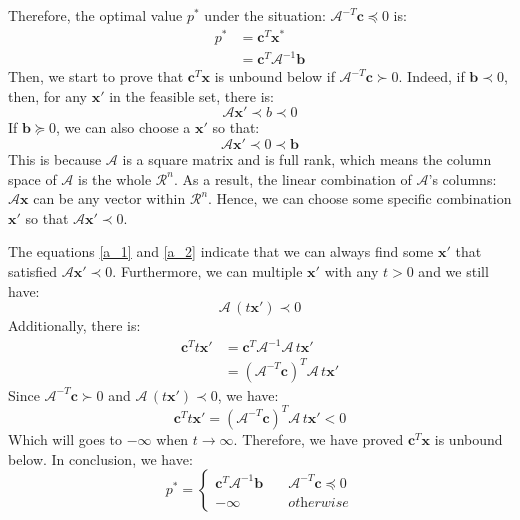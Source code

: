 \documentclass[10pt,a4paper]{article}
\begin{document}
Therefore, the optimal value $p^{*}$ under the situation: $\mathcal{A}^{-T} \mathbf{c} \preceq 0$ is:
\begin{equation}
	\begin{aligned}
		p^{*} &= \mathbf{c}^{T} \mathbf{x}^{*} \\
		&= \mathbf{c}^{T} \mathcal{A}^{-1} \mathbf{b}
	\end{aligned}
\end{equation}
Then, we start to prove that $\mathbf{c}^{T} \mathbf{x}$ is unbound below if $\mathcal{A}^{-T} \mathbf{c} \succ 0$. Indeed, if $\mathbf{b} \prec 0$, then, for any $\mathbf{x}'$ in the feasible set, there is:
\begin{equation}
	\mathcal{A} \mathbf{x}' \prec b \prec 0
	\label{a_1}
\end{equation}
If $\mathbf{b} \succeq 0$, we can also choose a $\mathbf{x}'$ so that:
\begin{equation}
	\mathcal{A} \mathbf{x}' \prec 0 \prec \mathbf{b}
	\label{a_2}
\end{equation}
This is because $\mathcal{A}$ is a square matrix and is full rank, which means the column space of $\mathcal{A}$ is the whole $\mathcal{R}^{n}$. As a result, the linear combination of $\mathcal{A}$'s columns: $\mathcal{A} \mathbf{x}$ can be any vector within $\mathcal{R}^{n}$. Hence, we can choose some specific combination $\mathbf{x}'$ so that $\mathcal{A} \mathbf{x}' \prec 0$.

The equations \ref{a_1} and \ref{a_2} indicate that we can always find some $\mathbf{x}'$ that satisfied  $\mathcal{A} \mathbf{x}' \prec 0$. Furthermore, we can multiple $\mathbf{x}'$ with any $t > 0$ and we still have:
\begin{equation}
	\mathcal{A} \, (t \mathbf{x}') \prec 0
\end{equation}
 Additionally, there is:
 \begin{equation}
 	\begin{aligned}
 		\mathbf{c}^{T} t\mathbf{x}' &=\mathbf{c}^{T} \mathcal{A}^{-1} \mathcal{A} \, t\mathbf{x}' \\
 		&= (\mathcal{A}^{-T} \mathbf{c})^{T} \mathcal{A} \, t \mathbf{x}'
 	\end{aligned}
 \end{equation}
Since $\mathcal{A}^{-T} \mathbf{c} \succ 0$ and $\mathcal{A} \, (t \mathbf{x}') \prec 0$, we have:
\begin{equation}
	\mathbf{c}^{T} t\mathbf{x}' = (\mathcal{A}^{-T} \mathbf{c})^{T} \mathcal{A} \, t \mathbf{x}' < 0
\end{equation}
Which will goes to $-\infty$ when $t \rightarrow \infty$. Therefore, we have proved $\mathbf{c}^{T} \mathbf{x}$ is unbound below. In conclusion, we have:
\begin{equation}
	p^{*} = 
	\begin{cases}
		\mathbf{c}^{T} \mathcal{A}^{-1} \mathbf{b} \quad & \mathcal{A}^{-T} \mathbf{c} \preceq 0 \\
		-\infty \quad & \textit{otherwise} 
	\end{cases}
\end{equation}
\end{document}
